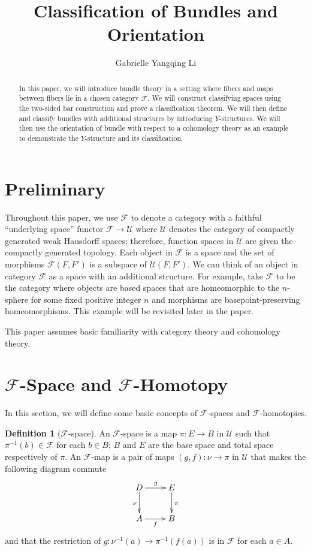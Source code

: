 \documentclass[psamsfonts]{amsart}
\title{Classification of Bundles and Orientation}
\author{Gabrielle Yangqing Li}
\theoremstyle{definition}
\newtheorem{defn}[thm]{Definition}
\theoremstyle{remark}
\numberwithin{equation}{section}
\begin{document}
\begin{abstract}
In this paper, we will introduce bundle theory in a setting where fibers and maps between fibers lie in a chosen category $\mathcal{F}$. We will construct classifying spaces using the two-sided bar construction and prove a classification theorem. We will then define and classify bundles with additional structures by introducing $Y$-structures. We will then use the orientation of bundle with respect to a cohomology theory as an example to demonstrate the $Y$-structure and its classification. 


\end{abstract}

\maketitle

\tableofcontents





\section{Preliminary}
\label{sec:prelim}
Throughout this paper, we use $\mathcal{F}$ to denote a category with a faithful ``underlying space'' functor $\mathcal{F} \rightarrow \mathcal{U}$ where $\mathcal{U}$ denotes the category of compactly generated weak Hausdorff spaces; therefore, function spaces in $\mathcal{U}$ are given the compactly generated topology.  Each object in $\mathcal{F}$ is a space and the set of morphisms $\mathcal{F}(F, F')$ is a subspace of $\mathcal{U}(F, F')$. We can think of an object in category $\mathcal{F}$ as a space with an additional structure. For example, take $\mathcal{F}$ to be the category where objects are based spaces that are homeomorphic to the $n$-sphere for some fixed positive integer $n$ and morphisms are basepoint-preserving homeomorphisms. This example will be revisited later in the paper.

This paper assumes basic familiarity with category theory and cohomology theory.

\section{$\mathcal{F}$-Space and $\mathcal{F}$-Homotopy}
In this section, we will define some basic concepts of $\mathcal{F}$-spaces and $\mathcal{F}$-homotopies. 

\begin{defn}[$\mathcal{F}$-space]
An $\mathcal{F}$-space is a map $\pi: E \rightarrow B$ in $\mathcal{U}$ such that $\pi^{-1}(b) \in \mathcal{F}$ for each $b \in B$; $B$ and $E$ are the base space and total space respectively of $\pi$. An $\mathcal{F}$-map is a pair of maps $(g, f): \nu \rightarrow \pi$ in $\mathcal{U}$ that makes the following diagram commute
\[\xymatrix{
D \ar[r]^-{g} \ar[d]_{\nu} & E \ar[d]^{\pi} \\
A \ar[r]_-{f} & B\\} \]
and that the restriction of $g: \nu^{-1}(a) \rightarrow \pi^{-1}(f(a))$ is in $\mathcal{F}$ for each $a \in A$.
\end{defn}
\end{document}
